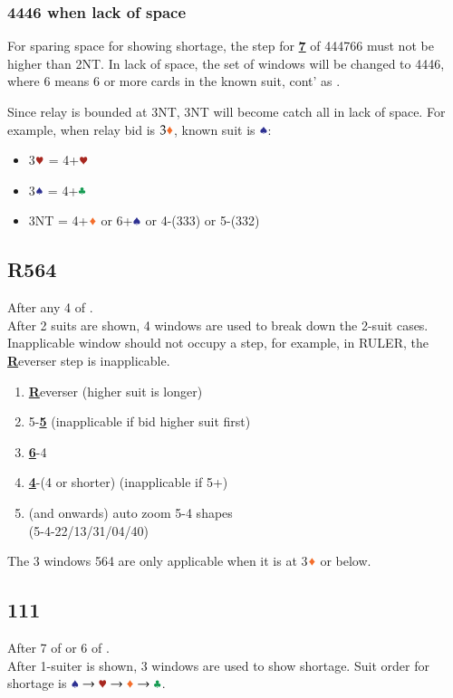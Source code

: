 \documentclass{article}
\begin{document}
\begin{multicols}{2}
\begin{CJK*}{UTF8}{gt}
\pagebreak

\subsubsection{4446 when lack of space}\label{sec:4446}
For sparing space for showing shortage, the step for \textbf{\underline{7}} of 444766 must not be higher than 2NT. In lack of space, the set of windows will be changed to 4446, where 6 means 6 or more cards in the known suit, cont' as .

\noindent Since relay is bounded at 3NT, 3NT will become catch all in lack of space. For example, when relay bid is $3\ddd$, known suit is $\sss$:
\begin{itemize}
    \item 3$\hhh$ = 4+$\hhh$
    \item 3$\sss$ = 4+$\ccc$
    \item 3NT = 4+$\ddd$ or 6+$\sss$ or 4-(333) or 5-(332)
\end{itemize}

\subsection{R564}\label{sec:R564}
After any 4 of . \\
After 2 suits are shown, 4 windows are used to break down the 2-suit cases. Inapplicable window should not occupy a step, for example, in RULER, the \textbf{\underline{R}}everser step is inapplicable.

\begin{enumerate}
    \item \textbf{\underline{R}}everser (higher suit is longer)
    \item 5-\textbf{\underline{5}} (inapplicable if bid higher suit first)
    \item \textbf{\underline{6}}-4
    \item \textbf{\underline{4}}-(4 or shorter) (inapplicable if 5+)
    \item (and onwards) auto zoom 5-4 shapes \\
        (5-4-22/13/31/04/40)
\end{enumerate}

\noindent The 3 windows 564 are only applicable when it is at 3$\ddd$ or below.

\subsection{111}\label{sec:111}
After 7 of  or 6 of . \\
After 1-suiter is shown, 3 windows are used to show shortage. Suit order for shortage is $\sss \rightarrow \hhh \rightarrow \ddd \rightarrow \ccc$.


\end{CJK*}
\end{multicols}
\end{document}
